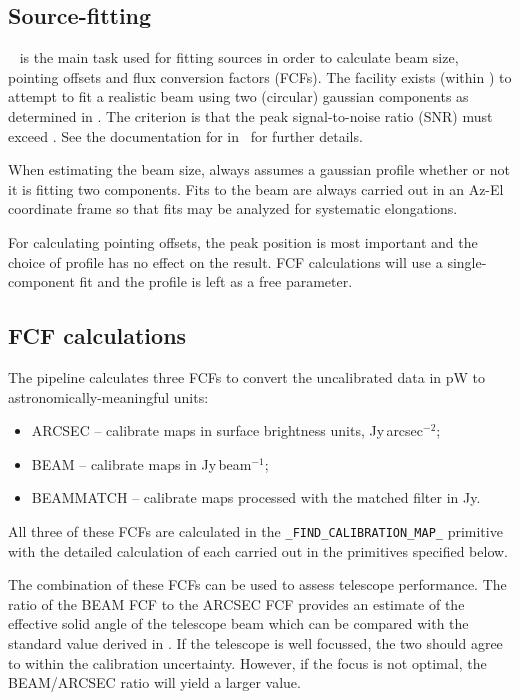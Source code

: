 \subsection{Source-fitting}

\KAPPA\  is the main task used for fitting sources in
order to calculate beam size, pointing offsets and flux conversion
factors (FCFs). The facility exists (within \picard) to attempt to fit
a realistic beam using two (circular) gaussian components as
determined in \cite{scuba2calpaper}. The criterion is that the peak
signal-to-noise ratio (SNR) must exceed \snrmin. See the documentation
for  in \picardsun\ for further details.

When estimating the beam size,  always assumes a
gaussian profile whether or not it is fitting two components. Fits to
the beam are always carried out in an Az-El coordinate frame so that
fits may be analyzed for systematic elongations.

For calculating pointing offsets, the peak position is most important
and the choice of profile has no effect on the result. FCF
calculations will use a single-component fit and the profile is left
as a free parameter.

\subsection{FCF calculations}

The pipeline calculates three FCFs to convert the uncalibrated data in
pW to astronomically-meaningful units:
\begin{itemize}
\item ARCSEC -- calibrate maps in surface brightness units,
  Jy\,arcsec$^{-2}$;
\item BEAM -- calibrate maps in Jy\,beam$^{-1}$;
\item BEAMMATCH -- calibrate maps processed with the matched filter in
  Jy.
\end{itemize}
All three of these FCFs are calculated in the
\verb+_FIND_CALIBRATION_MAP_+ primitive with the detailed calculation
of each carried out in the primitives specified below.

The combination of these FCFs can be used to assess telescope
performance. The ratio of the BEAM FCF to the ARCSEC FCF provides an
estimate of the effective solid angle of the telescope beam which can
be compared with the standard value derived in
\cite{scuba2calpaper}. If the telescope is well focussed, the two
should agree to within the calibration uncertainty. However, if the
focus is not optimal, the BEAM/ARCSEC ratio will yield a larger value.

